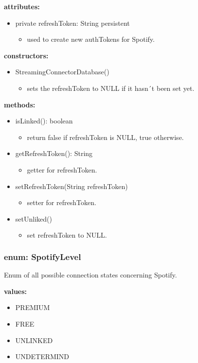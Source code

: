 \documentclass[oneside, ngerman]{sdqtechreport}
\begin{document}
\textbf{attributes:}
\begin{itemize}
    \item private refreshToken: String {persistent}
    \begin{itemize}
        \item used to create new authTokens for Spotify.
    \end{itemize}
\end{itemize}
\textbf{constructors:}
\begin{itemize}
    \item StreamingConnectorDatabase()
    \begin{itemize}
       \item sets the refreshToken to NULL if it hasn´t been set yet.
    \end{itemize}
\end{itemize}
\textbf{methods:}
\begin{itemize}
    \item isLinked(): boolean
    \begin{itemize}
        \item return false if refreshToken is NULL, true otherwise.
    \end{itemize}
    \item getRefreshToken(): String
    \begin{itemize}
        \item getter for refreshToken.
    \end{itemize}
    \item setRefreshToken(String refreshToken)
    \begin{itemize}
        \item setter for refreshToken.
    \end{itemize}
    \item setUnliked()
    \begin{itemize}
        \item set refreshToken to NULL.
    \end{itemize}
\end{itemize}

\subsubsection{enum: SpotifyLevel}
Enum of all possible connection states concerning Spotify.

\textbf{values:}
\begin{itemize}
    \item PREMIUM
    \item FREE
    \item UNLINKED
    \item UNDETERMIND
\end{itemize}
\end{document}
